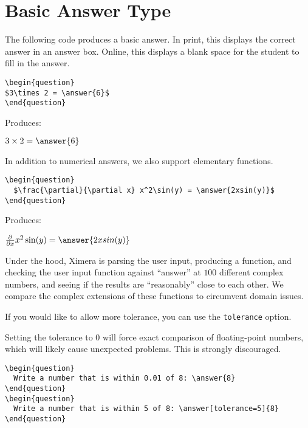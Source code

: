 \documentclass{ximera}
\begin{document}
\section{Basic Answer Type}

The following code produces a basic answer. In print, this displays the correct answer in an answer box. Online, this displays a blank space for the student to fill in the answer. 

\begin{verbatim}
\begin{question}
$3\times 2 = \answer{6}$
\end{question}
\end{verbatim}

Produces:

\begin{question}
$3\times 2 = \answer{6}$
\end{question}

In addition to numerical answers, we also support elementary functions.

\begin{verbatim}
\begin{question}
  $\frac{\partial}{\partial x} x^2\sin(y) = \answer{2xsin(y)}$
\end{question}
\end{verbatim}

Produces:

\begin{question}
  $\frac{\partial}{\partial x} x^2\sin(y) = \answer{2xsin(y)}$
\end{question}

\begin{remark}
Under the hood, Ximera is parsing the user input, producing a
function, and checking the user input function against ``answer'' at
$100$ different complex numbers, and seeing if the results are
``reasonably'' close to each other.  We compare the complex extensions
of these functions to circumvent domain issues.
\end{remark}

If you would like to allow more tolerance, you can use the \verb!tolerance! option. 

\begin{warning}
Setting the tolerance to 0 will force exact comparison of floating-point numbers, which will likely cause unexpected problems. This is strongly discouraged. 
\end{warning}

\begin{verbatim}
\begin{question}
  Write a number that is within 0.01 of 8: \answer{8}
\end{question}
\begin{question}
  Write a number that is within 5 of 8: \answer[tolerance=5]{8}
\end{question}
\end{verbatim}
\end{document}
